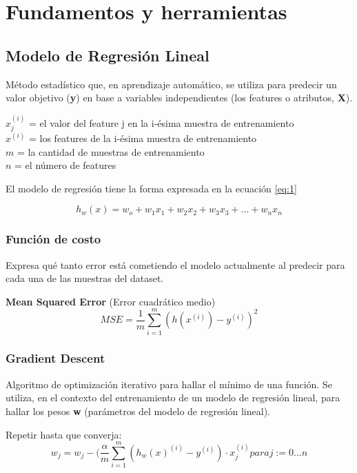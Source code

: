 \documentclass[
11pt, %
oneside, %
spanish, %
singlespacing, %
parskip, %
headsepline, %
chapterinoneline, %
]{MastersDoctoralThesis} %
\begin{document}
\chapter{Fundamentos y herramientas}

\section{Modelo de Regresión Lineal}
Método estadístico que, en aprendizaje automático, se utiliza para predecir un valor objetivo (\textbf{y}) en base a variables independientes (los features o atributos, \textbf{X}).

$ x_{j}^{(i)} $ = el valor del feature j en la i-ésima muestra de entrenamiento \\
$ x^{(i)} $ = los features de la i-ésima muestra de entrenamiento \\
$ m $ = la cantidad de muestras de entrenamiento \\
$ n $ = el número de features 

El modelo de regresión tiene la forma expresada en la ecuación \ref{eq:1}

\begin{equation}
h_{w}(x) = w_{o} + w_{1}x_{1} + w_{2}x_{2} + w_{3}x_{3} + ... + w_{n}x_{n} \label{eq:1}
\end{equation}

\subsection*{Función de costo}
Expresa qué tanto error está cometiendo el modelo actualmente al predecir para cada una de las muestras del dataset.

\textbf{Mean Squared Error} (Error cuadrático medio)
\begin{equation}
MSE = \frac{1}{m} \sum_{i=1}^{m} (h(x^{(i)}) - y^{(i)})^2
\end{equation} 

\subsection*{Gradient Descent}
Algoritmo de optimización iterativo para hallar el mínimo de una función. Se utiliza, en el contexto del entrenamiento de un modelo de regresión lineal, para hallar los pesos \textbf{w} (parámetros del modelo de regresión lineal).

Repetir hasta que converja:
\begin{equation}
w_{j} = w_{j} - (\frac{\alpha}{m} \sum_{i=1}^{m} (h_{w}(x)^{(i)} - y^{(i)}) \cdot x_{j}^{(i)} para j := 0...n
\end{equation}
\end{document}
